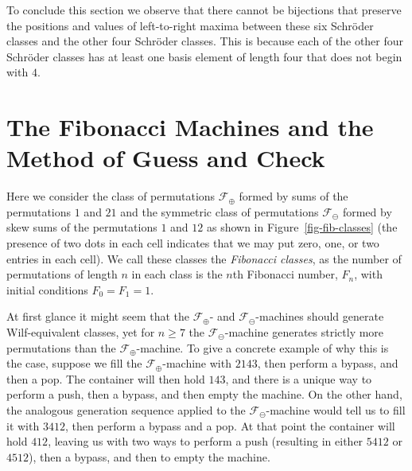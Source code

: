 \documentclass[10pt]{article}
\theoremstyle{plain}
\theoremstyle{definition}
\newcommand{\F}{\mathcal{F}}
\begin{document}

To conclude this section we observe that there cannot be bijections that preserve the positions and values of left-to-right maxima between these six Schr\"oder classes and the other four Schr\"oder classes. This is because each of the other four Schr\"oder classes has at least one basis element of length four that does not begin with $4$.

\section{The Fibonacci Machines and the Method of Guess and Check}
\label{sec-other-examples}

Here we consider the class of permutations $\F_\oplus$ formed by sums of the permutations $1$ and $21$ and the symmetric class of permutations $\F_\ominus$ formed by skew sums of the permutations $1$ and $12$ as shown in Figure~\ref{fig-fib-classes} (the presence of two dots in each cell indicates that we may put zero, one, or two entries in each cell). We call these classes the \emph{Fibonacci classes}, as the number of permutations of length $n$ in each class is the $n$th Fibonacci number, $F_n$, with initial conditions $F_0 = F_1 = 1$.

At first glance it might seem that the $\F_\oplus$- and $\F_\ominus$-machines should generate Wilf-equivalent classes, yet for $n\ge 7$ the $\F_\ominus$-machine generates strictly more permutations than the $\F_\oplus$-machine. To give a concrete example of why this is the case, suppose we fill the $\F_\oplus$-machine with $2143$, then perform a bypass, and then a pop. The container will then hold $143$, and there is a unique way to perform a push, then a bypass, and then empty the machine. On the other hand, the analogous generation sequence applied to the $\F_\ominus$-machine would tell us to fill it with $3412$, then perform a bypass and a pop. At that point the container will hold $412$, leaving us with two ways to perform a push (resulting in either $5412$ or $4512$), then a bypass, and then to empty the machine.
\end{document}
